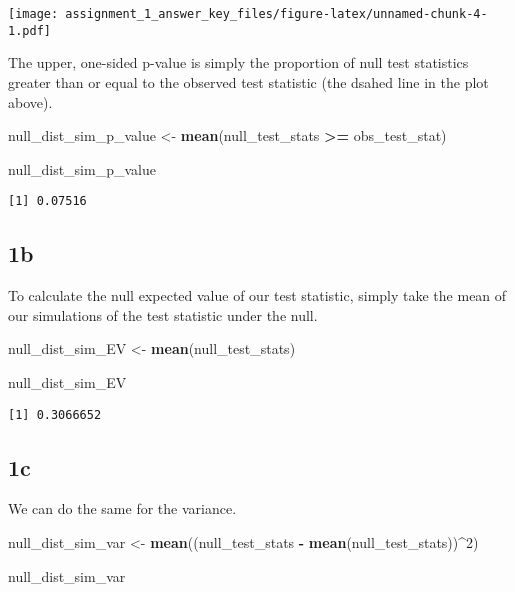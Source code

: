 \documentclass[
  12pt,
  leqno]{article}
\newenvironment{Shaded}{\begin{snugshade}}{\end{snugshade}}
\newcommand{\DecValTok}[1]{\textcolor[rgb]{0.00,0.00,0.81}{#1}}
\newcommand{\KeywordTok}[1]{\textcolor[rgb]{0.13,0.29,0.53}{\textbf{#1}}}
\newcommand{\NormalTok}[1]{#1}
\newcommand{\OperatorTok}[1]{\textcolor[rgb]{0.81,0.36,0.00}{\textbf{#1}}}
\newcommand{\StringTok}[1]{\textcolor[rgb]{0.31,0.60,0.02}{#1}}
\begin{document}
\texttt{[image: assignment\_1\_answer\_key\_files/figure-latex/unnamed-chunk-4-1.pdf]}
\normalsize

The upper, one-sided p-value is simply the proportion of null test
statistics greater than or equal to the observed test statistic (the
dsahed line in the plot above).

\begin{Shaded}
\begin{Highlighting}[]
\NormalTok{null\_dist\_sim\_p\_value \textless{}{-}}\StringTok{ }\KeywordTok{mean}\NormalTok{(null\_test\_stats }\OperatorTok{\textgreater{}=}\StringTok{ }\NormalTok{obs\_test\_stat)}

\NormalTok{null\_dist\_sim\_p\_value}
\end{Highlighting}
\end{Shaded}

\begin{verbatim}
[1] 0.07516
\end{verbatim}

\subsection*{1b}

To calculate the null expected value of our test statistic, simply take
the mean of our simulations of the test statistic under the null.

\begin{Shaded}
\begin{Highlighting}[]
\NormalTok{null\_dist\_sim\_EV \textless{}{-}}\StringTok{ }\KeywordTok{mean}\NormalTok{(null\_test\_stats)}

\NormalTok{null\_dist\_sim\_EV}
\end{Highlighting}
\end{Shaded}

\begin{verbatim}
[1] 0.3066652
\end{verbatim}

\subsection*{1c}

We can do the same for the variance.

\begin{Shaded}
\begin{Highlighting}[]
\NormalTok{null\_dist\_sim\_var \textless{}{-}}\StringTok{ }\KeywordTok{mean}\NormalTok{((null\_test\_stats }\OperatorTok{{-}}\StringTok{ }\KeywordTok{mean}\NormalTok{(null\_test\_stats))}\OperatorTok{\^{}}\DecValTok{2}\NormalTok{)}

\NormalTok{null\_dist\_sim\_var}
\end{Highlighting}
\end{Shaded}
\end{document}
